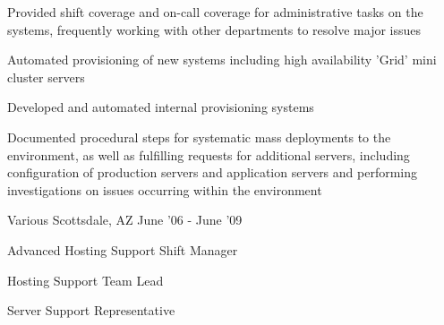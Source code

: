 \begin{cventries}
{\begin{cvitems}
          \item Provided shift coverage and on-call coverage for administrative tasks on the systems, frequently working with other departments to resolve major issues
          \item Automated provisioning of new systems including high availability 'Grid' mini cluster servers
          \item Developed and automated internal provisioning systems
          \item Documented procedural steps for systematic mass deployments to the environment, as well as fulfilling requests for additional servers, including configuration of production servers and application servers and performing investigations on issues occurring within the environment
        \end{cvitems}
    }
\vspace{4mm}
\cventry
    {Various} %
    {} %
    {Scottsdale, AZ} %
    {June '06 - June '09} %
    {
        \begin{cvitems}
		  \item Advanced Hosting Support Shift Manager
		  \item Hosting Support Team Lead 
		  \item Server Support Representative 
        \end{cvitems}
    }
\end{cventries}
